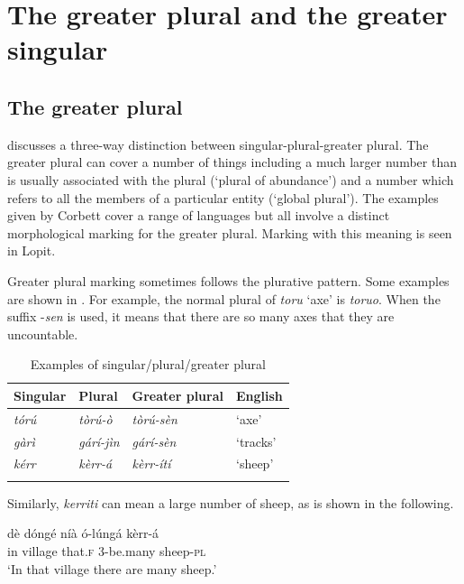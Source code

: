 \documentclass[output=paper]{langsci/langscibook}
\begin{document}
\section{The greater plural and the greater singular} \label{sec:moodie:5}


\subsection{The greater plural} \label{sec:moodie:5.1}

\citet[30]{Corbett2000} discusses a three-way distinction between singular-plural-greater plural. The greater plural can cover a number of things including a much larger number than is usually associated with the plural (‘plural of abundance’) and a number which refers to all the members of a particular entity (‘global plural’). The examples given by Corbett cover a range of languages but all involve a distinct morphological marking for the greater plural. Marking with this meaning is seen in Lopit. 

Greater plural marking sometimes follows the plurative pattern. Some examples are shown in . For example, the normal plural of \textit{toru} ‘axe’ is \textit{toruo}. When the suffix -\textit{sen }is used, it means that there are so many axes that they are uncountable.

\begin{table}
\begin{tabularx}{\textwidth}{XXXX}
\lsptoprule

 \textbf{Singular} & \textbf{Plural} & \textbf{Greater plural} & \textbf{English}\\ \midrule
\itshape t\'{o}r\'{u} & \itshape t\`{o}r\'{u}-\`{o} & \itshape t\`{o}r\'{u}-s\`{e}n & \mdseries ‘axe’\\
\itshape g\`{a}r\`{i} & \itshape g\'{a}r\'{i}-j\`{i}n & \itshape g\'{a}r\'{i}-s\`{e}n & \mdseries ‘tracks’\\
\itshape k\'{e}rr & \itshape k\`{e}rr-\'{a} & \itshape k\`{e}rr-\'{i}t\'{i} & \mdseries ‘sheep’\\
\lspbottomrule
\end{tabularx}
\caption{Examples of singular/plural/greater plural}
\label{tab:moodie:17}
\end{table}

Similarly, \textit{kerriti} can mean a large number of sheep, as is shown in the following.

\ea\label{ex:moodie:6}
\gll d\`{e} d\'{o}ng\'{e} n\'{i}\`{a} \'{o}-l\'{u}ng\'{a} k\`{e}rr-\'{a} \\
in village that.\textsc{f} 3-be.many sheep-\textsc{pl} \\
\glt ‘In that village there are many sheep.’
\z
\end{document}
